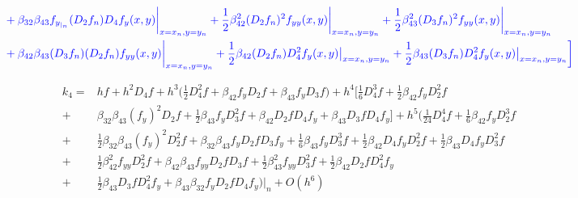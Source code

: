\documentclass[12 pt]{article}
\begin{document}
\begin{equation}
\begin{split}
		&\color{blue}+ \beta_{32}\beta_{43}f_{y_{|_{n}}}(D_{2}f_{n})D_{4}f_{y}(x,y)\bigg\vert_{x=x_{n}, y= y_{n}} + \frac{1}{2}\beta_{42}^{2}(D_{2}f_{n})^{2}f_{yy}(x,y)\bigg\vert_{x=x_{n}, y= y_{n}} + \frac{1}{2}\beta_{43}^{2}(D_{3}f_{n})^{2}f_{yy}(x,y)\bigg\vert_{x=x_{n}, y= y_{n}} \\
		&\color{blue}+ \beta_{42}\beta_{43}(D_{3}f_{n})(D_{2}f_{n})f_{yy}(x,y)\bigg\vert_{x=x_{n}, y= y_{n}} + \frac{1}{2}\beta_{42}(D_{2}f_{n})D_{4}^{2}f_{y}(x,y)\big\vert_{x = x_{n}, y= y_{n}} + \frac{1}{2}\beta_{43}(D_{3}f_{n})D_{4}^{2}f_{y}(x,y)\big\vert_{x = x_{n}, y= y_{n}}\bigg]
	\end{split}
\end{equation}



\large
\begin{align*}
k_{4} =& hf + h^{2}D_{4}f + h^{3}\bigg(\frac{1}{2}D_{4}^{2}f + \beta_{42}f_{y}D_{2}f + \beta_{43}f_{y}D_{3}f\bigg) + h^{4}\bigg[\frac{1}{6}D^{3}_{4}f + \frac{1}{2}\beta_{42}f_{y}D_{2}^{2}f\\
 	  +& \beta_{32}\beta_{43}(f_{y})^{2}D_{2}f + \frac{1}{2}\beta_{43}f_{y}D_{3}^{2}f + \beta_{42}D_{2}fD_{4}f_{y}	+ \beta_{43}D_{3}fD_{4}f_{y}\bigg] +  h^{5}\bigg(\frac{1}{24}D_{4}^{4}f + \frac{1}{6}\beta_{42}f_{y}D_{2}^{3}f\\
 	  +&\frac{1}{2}\beta_{32}\beta_{43}(f_{y})^{2}D_{2}^{2}f + \beta_{32}\beta_{43}f_{y}D_{2}fD_{3}f_{y} + \frac{1}{6}\beta_{43}f_{y}D_{3}^{3}f + \frac{1}{2}\beta_{42}D_{4}f_{y}D_{2}^{2}f + \frac{1}{2}\beta_{43}D_{4}f_{y}D_{3}^{2}f\\
 	  +&\frac{1}{2}\beta_{42}^{2}f_{yy}D_{2}^{2}f + \beta_{42}\beta_{43}f_{yy}D_{2}fD_{3}f + \frac{1}{2}\beta_{43}^{2}f_{yy}D_{3}^{2}f + \frac{1}{2}\beta_{42}D_{2}fD_{4}^{2}f_{y}\\
 	  +& \frac{1}{2}\beta_{43}D_{3}fD_{4}^{2}f_{y} + \beta_{43}\beta_{32}f_{y}D_{2}fD_{4}f_{y}\bigg)\bigg\vert_{n} + O(h^{6})
\end{align*}
\end{document}
